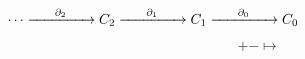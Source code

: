 \documentclass[14pt]{beamer}
\newcommand{\spc}[0]{\hspace{0.5cm}}
\begin{document}





\begin{frame}
	\large $\cdots \tot{\spc{}\del_2\spc{}} C_2 \tot{\spc{}\del_1\spc{}} C_1 \tot{\spc{}\del_0\spc{}} C_0$

	\large {}

	\tiny $$ + - \mapsto $$
\end{frame}
\end{document}
